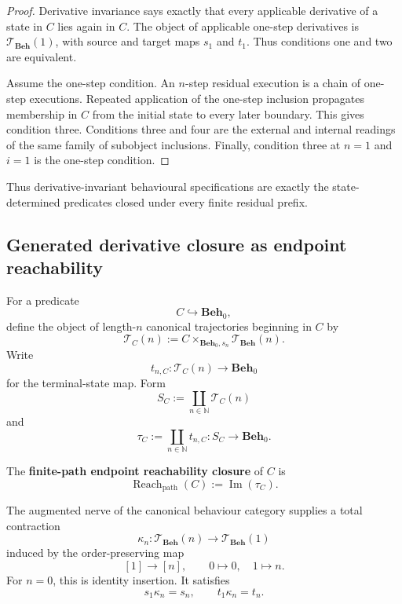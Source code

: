 \begin{proof}
Derivative invariance says exactly that every applicable derivative of a
state in \(C\) lies again in \(C\). The object of applicable one-step
derivatives is \(\mathscr T_{\mathbf{Beh}}(1)\), with source and target maps
\(s_1\) and \(t_1\). Thus conditions one and two are equivalent.

Assume the one-step condition. An \(n\)-step residual execution is a chain of
one-step executions. Repeated application of the one-step inclusion propagates
membership in \(C\) from the initial state to every later boundary. This gives
condition three. Conditions three and four are the external and internal
readings of the same family of subobject inclusions. Finally, condition three
at \(n=1\) and \(i=1\) is the one-step condition.
\end{proof}

Thus derivative-invariant behavioural specifications are exactly the
state-determined predicates closed under every finite residual prefix.

\subsection{Generated derivative closure as endpoint reachability}
\label{subsec:temporal-interpretation-generated-closure}

For a predicate
\[
    C\hookrightarrow\mathbf{Beh}_0,
\]
define the object of length-\(n\) canonical trajectories beginning in \(C\)
by
\[
    \mathscr T_C(n)
    :=
    C\times_{\mathbf{Beh}_0,s_n}
    \mathscr T_{\mathbf{Beh}}(n).
\]
Write
\[
    t_{n,C}:
    \mathscr T_C(n)
    \to
    \mathbf{Beh}_0
\]
for the terminal-state map. Form
\[
    S_C
    :=
    \coprod_{n\in\mathbb N}\mathscr T_C(n)
\]
and
\[
    \tau_C
    :=
    \coprod_{n\in\mathbb N}t_{n,C}:
    S_C\to\mathbf{Beh}_0.
\]

\begin{definition}
\label{def:temporal-reachability-closure}
The \textbf{finite-path endpoint reachability closure} of \(C\) is
\[
    \operatorname{Reach}_{\mathrm{path}}(C)
    :=
    \operatorname{Im}(\tau_C).
\]
\end{definition}

The augmented nerve of the canonical behaviour category supplies a total
contraction
\[
    \kappa_n:
    \mathscr T_{\mathbf{Beh}}(n)
    \to
    \mathscr T_{\mathbf{Beh}}(1)
\]
induced by the order-preserving map
\[
    [1]\to[n],
    \qquad
    0\mapsto0,
    \quad
    1\mapsto n.
\]
For \(n=0\), this is identity insertion. It satisfies
\[
    s_1\kappa_n=s_n,
    \qquad
    t_1\kappa_n=t_n.
\]

